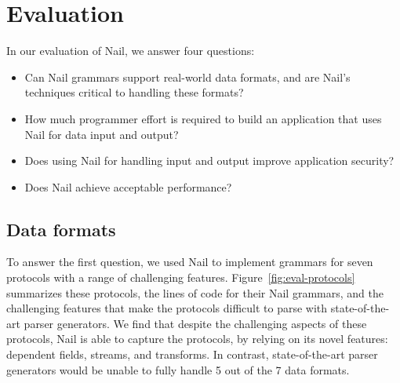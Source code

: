 \section{Evaluation}
\label{s:eval}



In our evaluation of Nail, we answer four questions:

\begin{itemize}

\item Can Nail grammars support real-world data formats, and
      are Nail's techniques critical to handling these formats?

\item How much programmer effort is required to build an
      application that uses Nail for data input and output?

\item Does using Nail for handling input and output improve
      application security?

\item Does Nail achieve acceptable performance?

\end{itemize}

\subsection{Data formats}
\label{s:eval-formats}

To answer the first question, we used Nail to implement grammars
for seven protocols with a range of challenging features.
Figure~\ref{fig:eval-protocols} summarizes these protocols, the lines
of code for their Nail grammars, and the challenging features that make
the protocols difficult to parse with state-of-the-art parser generators.
We find that despite the challenging aspects of these protocols, Nail is
able to capture the protocols, by relying on its novel features: dependent
fields, streams, and transforms.  In contrast, state-of-the-art parser
generators would be unable to fully handle 5 out of the 7 data formats.

